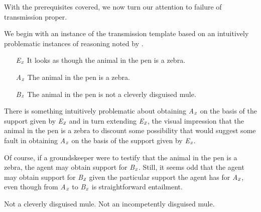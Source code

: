\documentclass[10pt]{article}
\newcommand{\tri}[2]{\emph{#2}\(_{\text{\tiny\emph #1}}\)}
\begin{document}
\begin{note}
  With the prerequisites covered, we now turn our attention to failure of transmission proper.

  We begin with an instance of the transmission template based on an intuitively problematic instances of reasoning noted by \textcite{Dretske:2005vy}.
  \begin{transmission}[Zebra]
    \begin{enumerate}
    \item[\tri{Z}{E}] It looks as though the animal in the pen is a zebra.
    \item[\tri{Z}{A}] The animal in the pen is a zebra.
    \item[\tri{Z}{B}] The animal in the pen is not a cleverly disguised mule.
    \end{enumerate}
  \end{transmission}
  There is something intuitively problematic about obtaining \tri{Z}{A} on the basis of the support given by \tri{Z}{E} and in turn extending \tri{Z}{E}, the visual impression that the animal in the pen is a zebra to discount some possibility that would suggest some fault in obtaining \tri{Z}{A} on the basis of the support given by \tri{Z}{E}.

  Of course, if a groundskeeper were to testify that the animal in the pen is a zebra, the agent may obtain support for \tri{Z}{B}.
  Still, it seems odd that the agent may obtain support for \tri{Z}{B} given the particular support the agent has for \tri{Z}{A}, even though from \tri{Z}{A} to \tri{Z}{B} is straightforward entailment.
\end{note}

\begin{note}
  Not a cleverly disguised mule.
  Not an incompetently disguised mule.
\end{note}
\end{document}
